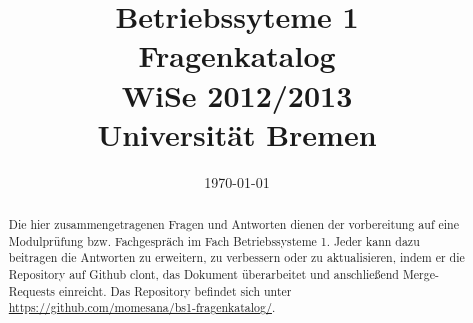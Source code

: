 \documentclass[12pt,a4paper,ngerman]{scrartcl}
\title{Betriebssyteme 1 \\ Fragenkatalog \\ WiSe 2012/2013 \\[5pt] \Large{Universität Bremen}}
\date{\today}
\makeatletter
\newcommand{\question}[1]{
	\subsection[\truncate{0.80\textwidth}{#1}]{
	\textcolor{blue}{#1}}}
\newenvironment{multilinequestion}[1][]
	{\subsection[\truncate{0.80\textwidth}{#1}]{\textcolor{blue}{#1}} \color{blue}}
	{}
\newlength\RightBarWidth
\newenvironment{rightbar}
	{
	\def\FrameCommand##1{%
	\hspace{\textwidth}\hspace{-\RightBarWidth}%
	{\color{dkgreen}\vrule width \RightBarWidth}
	\hspace{-\textwidth}##1\hfill}%
	\MakeFramed{\addtolength\hsize{-\width-\RightBarWidth-\columnsep}%
	\FrameRestore}%
	}
	{\endMakeFramed}
\newcommand\mystuff@footnotebuffer{}
\newcounter{mystuff@footnote}
\newcommand\bufferfootnotes{
	\let\mystuff@footnoteold\footnote
	\setcounter{mystuff@footnote}{\thefootnote}
	\renewcommand\mystuff@footnotebuffer{}
	\renewcommand{\footnote}[1]{
		\footnotemark
		\g@addto@macro{\mystuff@footnotebuffer}{
			\stepcounter{mystuff@footnote}
			\protect\footnotetext[\themystuff@footnote]{##1}
		}
	}
}
\newcommand\stopbufferingfootnotes{%
	\mystuff@footnotebuffer%
	\renewcommand{\footnote}[1]{\mystuff@footnoteold{##1}}%
}
\newenvironment {answer}
                {\bufferfootnotes\begin{rightbar} }
                {\end{rightbar}\stopbufferingfootnotes}
\makeatother
\begin{document}
\maketitle

\begin{abstract}
Die hier zusammengetragenen Fragen und Antworten dienen der vorbereitung auf eine Modulprüfung bzw. Fachgespräch im Fach Betriebssysteme 1. Jeder kann dazu beitragen die Antworten zu erweitern, zu verbessern oder zu aktualisieren, indem er die Repository auf Github clont, das Dokument überarbeitet und anschließend Merge-Requests einreicht. Das Repository befindet sich unter  \url{https://github.com/momesana/bs1-fragenkatalog/}.
\end{abstract}

\newpage

\tableofcontents 

%
%
















%

%

%
\end{document}
